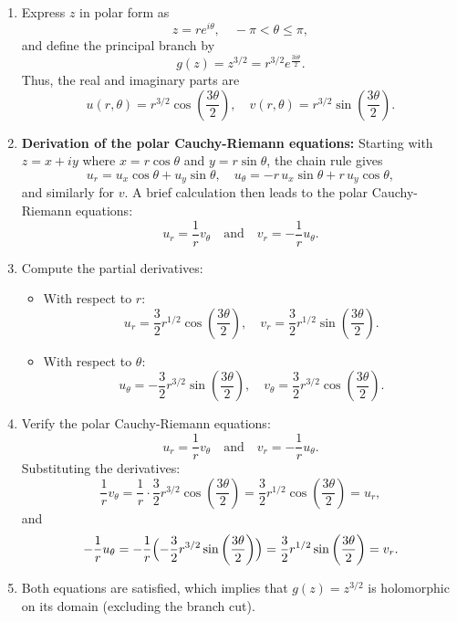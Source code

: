 \begin{example}
\begin{solution}
\begin{enumerate}
\begin{enumerate}
  \item Express \( z \) in polar form as
  \[
  z=re^{i\theta},\quad -\pi<\theta\le\pi,
  \]
  and define the principal branch by
  \[
  g(z)=z^{3/2}=r^{3/2}e^{\frac{3i\theta}{2}}.
  \]
  Thus, the real and imaginary parts are
  \[
  u(r,\theta)=r^{3/2}\cos\left(\frac{3\theta}{2}\right),\quad v(r,\theta)=r^{3/2}\sin\left(\frac{3\theta}{2}\right).
  \]
  
  \item \textbf{Derivation of the polar Cauchy-Riemann equations:}  
  Starting with \( z=x+iy \) where \( x=r\cos\theta \) and \( y=r\sin\theta \), the chain rule gives
  \[
  u_r=u_x\cos\theta+u_y\sin\theta,\quad u_\theta=-r\,u_x\sin\theta+r\,u_y\cos\theta,
  \]
  and similarly for \( v \). A brief calculation then leads to the polar Cauchy-Riemann equations:
  \[
  u_r=\frac{1}{r}v_\theta\quad \text{and}\quad v_r=-\frac{1}{r}u_\theta.
  \]
  
  \item Compute the partial derivatives:
  
  \begin{itemize}
    \item With respect to \( r \):
    \[
    u_r=\frac{3}{2}r^{1/2}\cos\left(\frac{3\theta}{2}\right),\quad v_r=\frac{3}{2}r^{1/2}\sin\left(\frac{3\theta}{2}\right).
    \]
    
    \item With respect to \( \theta \):
    \[
    u_\theta=-\frac{3}{2}r^{3/2}\sin\left(\frac{3\theta}{2}\right),\quad v_\theta=\frac{3}{2}r^{3/2}\cos\left(\frac{3\theta}{2}\right).
    \]
  \end{itemize}
  
  \item Verify the polar Cauchy-Riemann equations:
  \[
  u_r=\frac{1}{r}v_\theta\quad \text{and}\quad v_r=-\frac{1}{r}u_\theta.
  \]
  Substituting the derivatives:
  \[
  \frac{1}{r}v_\theta=\frac{1}{r}\cdot\frac{3}{2}r^{3/2}\cos\left(\frac{3\theta}{2}\right)
  =\frac{3}{2}r^{1/2}\cos\left(\frac{3\theta}{2}\right)=u_r,
  \]
  and
  \[
  -\frac{1}{r}u_\theta=-\frac{1}{r}\Bigl(-\frac{3}{2}r^{3/2}\sin\left(\frac{3\theta}{2}\right)\Bigr)
  =\frac{3}{2}r^{1/2}\sin\left(\frac{3\theta}{2}\right)=v_r.
  \]
  
  \item Both equations are satisfied, which implies that \( g(z)=z^{3/2} \) is holomorphic on its domain (excluding the branch cut).
\end{enumerate}

\end{enumerate}
\end{solution}
\end{example}
\exampleline



